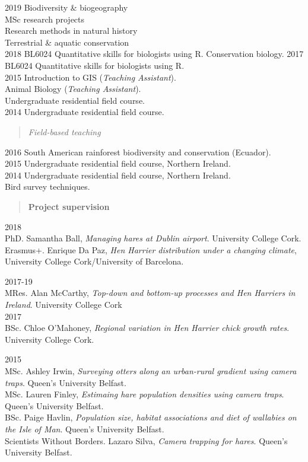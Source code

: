 \documentclass[]{article}
\begin{document}
2019 Biodiversity \& biogeography\\
MSc research projects\\
Research methods in natural history\\
Terrestrial \& aquatic conservation\\
2018 BL6024 Quantitative skills for biologists using R. Conservation
biology. 2017 BL6024 Quantitative skills for biologists using R.\\
2015 Introduction to GIS (\emph{Teaching Assistant}).\\
Animal Biology (\emph{Teaching Assistant}).\\
Undergraduate residential field course.\\
2014 Undergraduate residential field course.

\begin{quote}
\emph{Field-based teaching}
\end{quote}

2016 South American rainforest biodiversity and conservation
(Ecuador).\\
2015 Undergraduate residential field course, Northern Ireland.\\
2014 Undergraduate residential field course, Northern Ireland.\\
Bird survey techniques.

\begin{quote}
\textbf{Project supervision}
\end{quote}

2018\\
PhD. Samantha Ball, \emph{Managing hares at Dublin airport}. University
College Cork.\\
Erasmus+. Enrique Da Paz, \emph{Hen Harrier distribution under a
changing climate}, University College Cork/University of Barcelona.

2017-19\\
MRes. Alan McCarthy, \emph{Top-down and bottom-up processes and Hen
Harriers in Ireland}. University College Cork\\
2017\\
BSc. Chloe O'Mahoney, \emph{Regional variation in Hen Harrier chick
growth rates}. University College Cork.

2015\\
MSc. Ashley Irwin, \emph{Surveying otters along an urban-rural gradient
using camera traps}. Queen's University Belfast.\\
MSc. Lauren Finley, \emph{Estimaing hare population densities using
camera traps}. Queen's University Belfast.\\
BSc. Paige Havlin, \emph{Population size, habitat associations and diet
of wallabies on the Isle of Man}. Queen's University Belfast.\\
Scientists Without Borders. Lazaro Silva, \emph{Camera trapping for
hares}. Queen's University Belfast.
\end{document}
